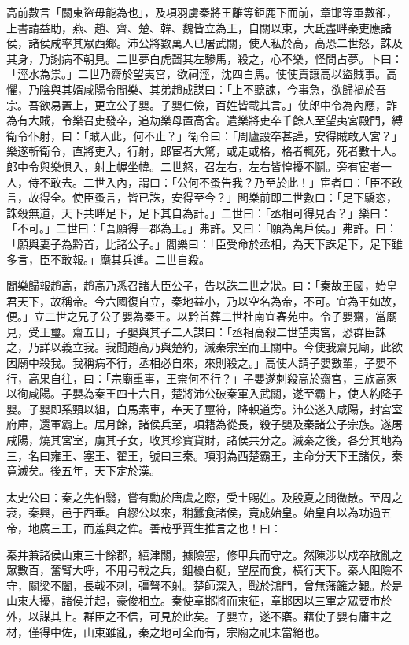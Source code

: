 \begin{pinyinscope}
高前數言「關東盜毋能為也」，及項羽虜秦將王離等鉅鹿下而前，章邯等軍數卻，上書請益助，燕、趙、齊、楚、韓、魏皆立為王，自關以東，大氐盡畔秦吏應諸侯，諸侯咸率其眾西鄉。沛公將數萬人已屠武關，使人私於高，高恐二世怒，誅及其身，乃謝病不朝見。二世夢白虎齧其左驂馬，殺之，心不樂，怪問占夢。卜曰：「涇水為祟。」二世乃齋於望夷宮，欲祠涇，沈四白馬。使使責讓高以盜賊事。高懼，乃陰與其婿咸陽令閻樂、其弟趙成謀曰：「上不聽諫，今事急，欲歸禍於吾宗。吾欲易置上，更立公子嬰。子嬰仁儉，百姓皆載其言。」使郎中令為內應，詐為有大賊，令樂召吏發卒，追劫樂母置高舍。遣樂將吏卒千餘人至望夷宮殿門，縛衛令仆射，曰：「賊入此，何不止？」衛令曰：「周廬設卒甚謹，安得賊敢入宮？」樂遂斬衛令，直將吏入，行射，郎宦者大驚，或走或格，格者輒死，死者數十人。郎中令與樂俱入，射上幄坐幃。二世怒，召左右，左右皆惶擾不鬬。旁有宦者一人，侍不敢去。二世入內，謂曰：「公何不蚤告我？乃至於此！」宦者曰：「臣不敢言，故得全。使臣蚤言，皆已誅，安得至今？」閻樂前即二世數曰：「足下驕恣，誅殺無道，天下共畔足下，足下其自為計。」二世曰：「丞相可得見否？」樂曰：「不可。」二世曰：「吾願得一郡為王。」弗許。又曰：「願為萬戶侯。」弗許。曰：「願與妻子為黔首，比諸公子。」閻樂曰：「臣受命於丞相，為天下誅足下，足下雖多言，臣不敢報。」麾其兵進。二世自殺。

閻樂歸報趙高，趙高乃悉召諸大臣公子，告以誅二世之狀。曰：「秦故王國，始皇君天下，故稱帝。今六國復自立，秦地益小，乃以空名為帝，不可。宜為王如故，便。」立二世之兄子公子嬰為秦王。以黔首葬二世杜南宜春苑中。令子嬰齋，當廟見，受王璽。齋五日，子嬰與其子二人謀曰：「丞相高殺二世望夷宮，恐群臣誅之，乃詳以義立我。我聞趙高乃與楚約，滅秦宗室而王關中。今使我齋見廟，此欲因廟中殺我。我稱病不行，丞相必自來，來則殺之。」高使人請子嬰數輩，子嬰不行，高果自往，曰：「宗廟重事，王柰何不行？」子嬰遂刺殺高於齋宮，三族高家以徇咸陽。子嬰為秦王四十六日，楚將沛公破秦軍入武關，遂至霸上，使人約降子嬰。子嬰即系頸以組，白馬素車，奉天子璽符，降軹道旁。沛公遂入咸陽，封宮室府庫，還軍霸上。居月餘，諸侯兵至，項籍為從長，殺子嬰及秦諸公子宗族。遂屠咸陽，燒其宮室，虜其子女，收其珍寶貨財，諸侯共分之。滅秦之後，各分其地為三，名曰雍王、塞王、翟王，號曰三秦。項羽為西楚霸王，主命分天下王諸侯，秦竟滅矣。後五年，天下定於漢。

太史公曰：秦之先伯翳，嘗有勳於唐虞之際，受土賜姓。及殷夏之閒微散。至周之衰，秦興，邑于西垂。自繆公以來，稍蠶食諸侯，竟成始皇。始皇自以為功過五帝，地廣三王，而羞與之侔。善哉乎賈生推言之也！曰：

秦并兼諸侯山東三十餘郡，繕津關，據險塞，修甲兵而守之。然陳涉以戍卒散亂之眾數百，奮臂大呼，不用弓戟之兵，鉏櫌白梃，望屋而食，橫行天下。秦人阻險不守，關梁不闔，長戟不刺，彊弩不射。楚師深入，戰於鴻門，曾無藩籬之艱。於是山東大擾，諸侯并起，豪俊相立。秦使章邯將而東征，章邯因以三軍之眾要市於外，以謀其上。群臣之不信，可見於此矣。子嬰立，遂不寤。藉使子嬰有庸主之材，僅得中佐，山東雖亂，秦之地可全而有，宗廟之祀未當絕也。


\end{pinyinscope}
